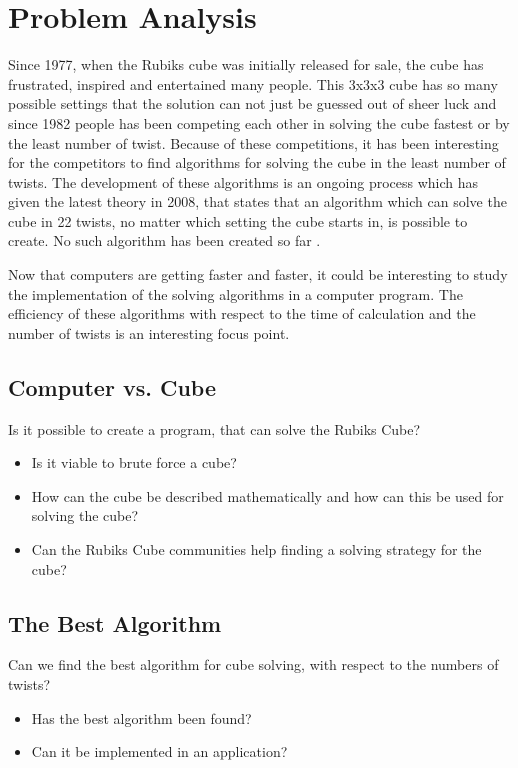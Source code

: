 \documentclass{report}
\begin{document}
\chapter{Problem Analysis}
Since 1977, when the Rubiks cube was initially released for sale, the cube has frustrated, inspired and entertained many people. This 3x3x3 cube has so many possible settings that the solution can not just be guessed out of sheer luck and since 1982 people has been competing each other in solving the cube fastest or by the least number of twist. Because of these competitions, it has been interesting for the competitors to find algorithms for solving the cube in the least number of twists. The development of these algorithms is an ongoing process which has given the latest theory in 2008, that states that an algorithm which can solve the cube in 22 twists, no matter which setting the cube starts in, is possible to create. No such algorithm has been created so far \cite{}.

Now that computers are getting faster and faster, it could be interesting to study the implementation of the solving algorithms in a computer program. The efficiency of these algorithms with respect to the time of calculation and the number of twists is an interesting focus point.
\section{Computer vs. Cube}
Is it possible to create a program, that can solve the Rubiks Cube?
\begin{itemize}
	\item Is it viable to brute force a cube?
	\item How can the cube be described mathematically and how can this be used for solving the cube?
	\item Can the Rubiks Cube communities help finding a solving strategy for the cube?
\end{itemize}
\section{The Best Algorithm}
Can we find the best algorithm for cube solving, with respect to the numbers of twists?
\begin{itemize}
	\item Has the best algorithm been found?
	\item Can it be implemented in an application?
\end{itemize}
\end{document}
